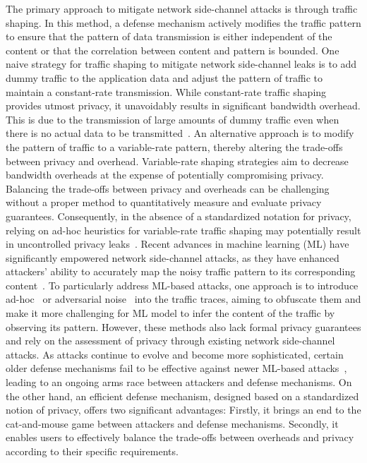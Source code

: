 The primary approach to mitigate network side-channel attacks is through traffic shaping. In this method, a defense mechanism actively modifies the traffic pattern to ensure that the pattern of data transmission is either independent of the content or that the correlation between content and pattern is bounded.  
One naive strategy for traffic shaping to mitigate network side-channel leaks is to add dummy traffic to the application data and adjust the pattern of traffic to maintain a constant-rate transmission.
While constant-rate traffic shaping provides utmost privacy, it unavoidably results in significant bandwidth overhead.
This is due to the transmission of large amounts of dummy traffic even when there is no actual data to be transmitted~\cite{saponas2007devices}.  
An alternative approach is to modify the pattern of traffic to a variable-rate pattern, thereby altering the trade-offs between privacy and overhead.
Variable-rate shaping strategies aim to decrease bandwidth overheads at the expense of potentially compromising privacy.
Balancing the trade-offs between privacy and overheads can be challenging without a proper method to quantitatively measure and evaluate privacy guarantees. 
Consequently, in the absence of a standardized notation for privacy, relying on ad-hoc heuristics for variable-rate traffic shaping may potentially result in uncontrolled privacy leaks~\cite{gong2020zero, cai2014csbuflo, lu2018dynaflow, juarez2016wtfpad, cai2014tamaraw}.
Recent advances in machine learning (ML) have significantly empowered network side-channel attacks, as they have enhanced attackers' ability to accurately map the noisy traffic pattern to its corresponding content~\cite{schuster2017beautyburst, bhat2019varcnn, hayes2016kfp, sirinam2018df}.
To particularly address ML-based attacks, one approach is to introduce ad-hoc~\cite{luo2011httpos} or adversarial noise~\cite{shan2021dolos, nasr2021blind, rahman2020mockingbird} into the traffic traces, aiming to obfuscate them and make it more challenging for ML model to infer the content of the traffic by observing its pattern. 
However, these methods also lack formal privacy guarantees and rely on the assessment of privacy through existing network side-channel attacks.
As attacks continue to evolve and become more sophisticated, certain older defense mechanisms fail to be effective against newer ML-based attacks~\cite{sirinam2018df}, leading to an ongoing arms race between attackers and defense mechanisms. 
On the other hand, an efficient defense mechanism, designed based on a standardized notion of privacy, offers two significant advantages: Firstly, it brings an end to the cat-and-mouse game between attackers and defense mechanisms. Secondly, it enables users to effectively balance the trade-offs between overheads and privacy according to their specific requirements.  



